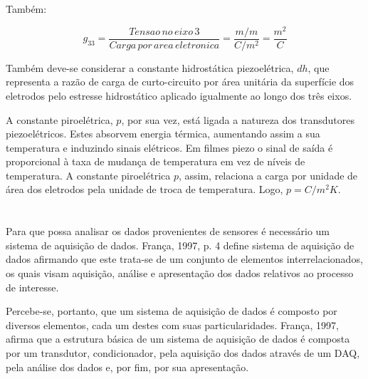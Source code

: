 \documentclass[
	12pt,				
	oneside,			
	a4paper,			
	english,			
	brazil,			
	]{abntex2ppgsi}
\begin{document}
Também:

\begin{equation}
	g_{33} = \frac{Tensao \,no \,eixo \,3}{Carga \,por \,area \,eletronica} = \frac{m/m}{C/m^{2}} = \frac{m^{2}}{C}
	\label{eq: Contante G, expressando a tensão ao longo de um eixo específico pela carga elétrica por área unitária de eletrodos.}
\end{equation}

Também deve-se considerar a constante hidrostática piezoelétrica, $dh$, que representa a razão de carga de curto-circuito por área unitária da superfície dos eletrodos pelo estresse hidrostático aplicado igualmente ao longo dos três eixos. 

A constante piroelétrica, $p$, por sua vez, está ligada a natureza dos transdutores piezoelétricos. Estes absorvem energia térmica, aumentando assim a sua temperatura e induzindo sinais elétricos. Em filmes piezo o sinal de saída é proporcional à taxa de mudança de temperatura em vez de níveis de temperatura. A constante piroelétrica $p$, assim, relaciona a carga por unidade de área dos eletrodos pela unidade de troca de temperatura. Logo, $p = C/m^{2} K$.


\newpage
\section{}

Para que possa analisar os dados provenientes de sensores é necessário um sistema de aquisição de dados. França, 1997, p. 4 define sistema de aquisição de dados afirmando que este trata-se de um conjunto de elementos interrelacionados, os quais visam aquisição, análise e apresentação dos dados relativos ao processo de interesse.

Percebe-se, portanto, que um sistema de aquisição de dados é composto por diversos elementos, cada um destes com suas particularidades. França, 1997, afirma que a estrutura básica de um sistema de aquisição de dados é composta por um transdutor, condicionador, pela aquisição dos dados através de um DAQ, pela análise dos dados e, por fim, por sua apresentação. 


\subsection{}
\label{sub:condicionamento}
\end{document}
